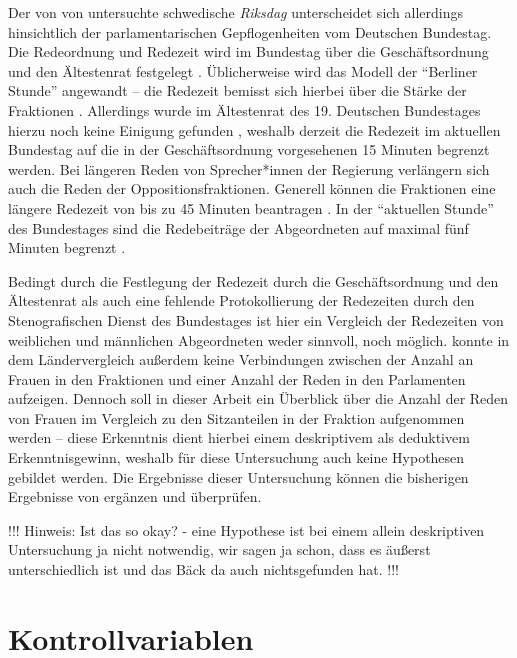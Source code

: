 \documentclass[12pt, 
    twoside=false, 
    bibliography=totoc, 
    numbers=endperiod, 
    headings=normal, 
    toc=chapterentrydotfill
    ]{scrbook}
\begin{document}
Der von von \textcite{back_2014} untersuchte schwedische \emph{Riksdag} unterscheidet sich allerdings hinsichtlich der parlamentarischen Gepflogenheiten vom Deutschen Bundestag. Die Redeordnung und Redezeit wird im Bundestag über die Geschäftsordnung und den Ältestenrat festgelegt \parencite[64f.]{linn_2018}. Üblicherweise wird das Modell der \enquote{Berliner Stunde} angewandt -- die Redezeit bemisst sich hierbei über die Stärke der Fraktionen \parencite[vgl.][]{schreiner_2005}. Allerdings wurde im Ältestenrat des 19. Deutschen Bundestages hierzu noch keine Einigung gefunden \parencite[64]{linn_2018}, weshalb derzeit die Redezeit im aktuellen Bundestag auf die in der Geschäftsordnung vorgesehenen 15 Minuten begrenzt werden. Bei längeren Reden von Sprecher*innen der Regierung verlängern sich auch die Reden der Oppositionsfraktionen. Generell können die Fraktionen eine längere Redezeit von bis zu 45 Minuten beantragen \parencite{bundestag_2019}. In der \enquote{aktuellen Stunde} des Bundestages sind die Redebeiträge der Abgeordneten auf maximal fünf Minuten begrenzt \parencites[68]{linn_2018}[]{bundestag_2019}.

Bedingt durch die Festlegung der Redezeit durch die Geschäftsordnung und den Ältestenrat als auch eine fehlende Protokollierung der Redezeiten durch den Stenografischen Dienst des Bundestages ist hier ein Vergleich der Redezeiten von weiblichen und männlichen Abgeordneten weder sinnvoll, noch möglich.
\textcite{back_2018} konnte in dem Ländervergleich außerdem keine Verbindungen zwischen der Anzahl an Frauen in den Fraktionen und einer Anzahl der Reden in den Parlamenten aufzeigen. Dennoch soll in dieser Arbeit ein Überblick über die Anzahl der Reden von Frauen im Vergleich zu den Sitzanteilen in der Fraktion aufgenommen werden -- diese Erkenntnis dient hierbei einem deskriptivem als deduktivem Erkenntnisgewinn, weshalb für diese Untersuchung auch keine Hypothesen gebildet werden. Die Ergebnisse dieser Untersuchung können die bisherigen Ergebnisse von \textcite{back_2018} ergänzen und überprüfen.

!!! Hinweis: Ist das so okay? - eine Hypothese ist bei einem allein deskriptiven Untersuchung ja nicht notwendig, wir sagen ja schon, dass es äußerst unterschiedlich ist und das Bäck da auch nichtsgefunden hat. !!!

\section{Kontrollvariablen}
\end{document}
